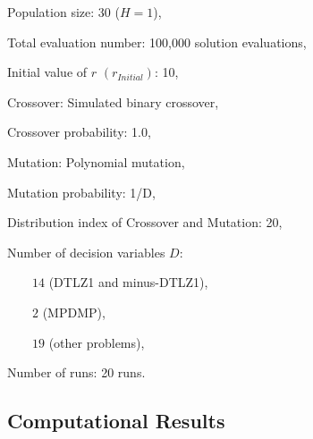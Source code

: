 \documentclass[conference]{IEEEtran}
\begin{document}
Population size: 30 ($H=1$), 

Total evaluation number: 100,000 solution evaluations,

Initial value of $r$ $(r_{Initial})$: 10, 

Crossover: Simulated binary crossover, 

Crossover probability: 1.0,

Mutation: Polynomial mutation, 

Mutation probability: 1/D, 

Distribution index of Crossover and Mutation: 20, 

Number of decision variables $D$:

$\qquad 14$ (DTLZ1 and minus-DTLZ1),

$\qquad 2$ (MPDMP),

$\qquad 19$ (other problems),

Number of runs: 20 runs.

% 
\subsection{Computational Results}
\end{document}
